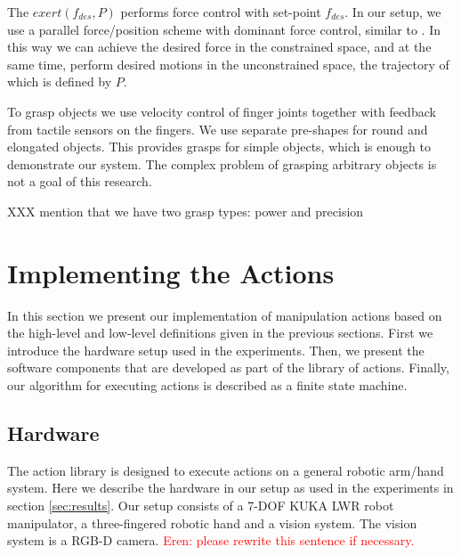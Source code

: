 The $exert(f_{des},P)$ performs force control with set-point $f_{des}$.
In our setup, we use a parallel force/position scheme with dominant force control, similar to \cite{chiaverini1993parallel}.
In this way we can achieve the desired force in the constrained space, and at the same time, perform desired motions in the unconstrained space,
the trajectory of which is defined by $P$.


To grasp objects we use velocity control of finger joints together with feedback from tactile sensors on the fingers.
We use separate pre-shapes for round and elongated objects.
This provides grasps for simple objects, which is enough to demonstrate our system.
The complex problem of grasping arbitrary objects is not a goal of this research.

XXX mention that we have two grasp types: power and precision


\section{Implementing the Actions}
\label{sec:Implementing}

In this section we present our implementation of manipulation actions based on the high-level and low-level definitions given in the previous sections.
First we introduce the hardware setup used in the experiments.
Then, we present the software components that are developed as part of the library of actions.
Finally, our algorithm for executing actions is described as a finite state machine.



\subsection{Hardware}
\label{sec:hardware}
The action library is designed to execute actions on a general robotic arm/hand system.
Here we describe the hardware in our setup as used in the experiments in section \ref{sec:results}.
Our setup consists of a 7-DOF KUKA LWR robot manipulator, a three-fingered robotic hand and a vision system. 
The vision system is a RGB-D camera. \textcolor{red}{Eren: please rewrite this sentence if necessary.}


